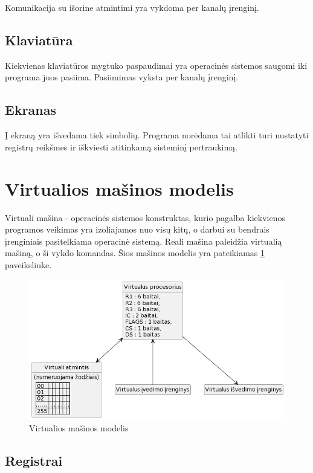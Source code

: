 \documentclass{VUMIFInfKursinis}
\begin{document}
Komunikacija su išorine atmintimi yra vykdoma per kanalų įrenginį.

\subsection{Klaviatūra}

Kiekvienas klaviatūros mygtuko paspaudimai yra operacinės sistemos saugomi iki programa juos pasiima. Pasiimimas vyksta per kanalų įrenginį.

\subsection{Ekranas}

Į ekraną yra išvedama tiek simbolių. Programa norėdama tai  atlikti turi nustatyti registrų reikšmes ir iškviesti atitinkamą sisteminį pertraukimą.

\section{Virtualios mašinos modelis}

Virtuali mašina - operacinės sistemos konstruktas, kurio pagalba kiekvienos programos veikimas yra izoliajamos nuo visų kitų, o darbui su bendrais įrenginiais pasitelkiama operacinė sistemą. Reali mašina paleidžia virtualią mašiną, o ši vykdo komandas. Šios mašinos modelis yra pateikiamas \ref{img:virtuali_masina} paveiksliuke.

\begin{figure}[H]
	\centering	
	\includegraphics[scale=0.65]{img/virtuali_masina}
	\caption{Virtualios mašinos modelis}   %
	\label{img:virtuali_masina}
\end{figure}

\subsection{Registrai}
\end{document}
